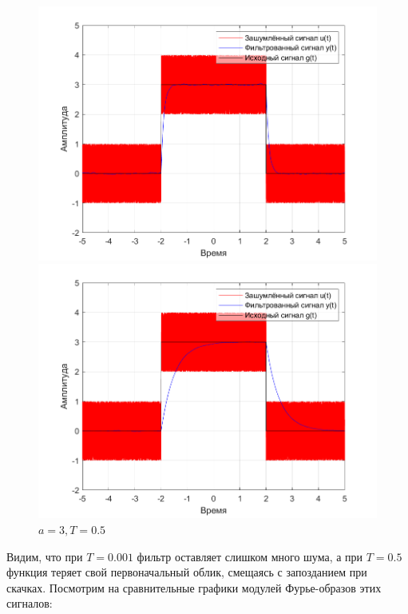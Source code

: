 \documentclass[a4paper]{article}
\begin{document}
\begin{figure}[H]
    \begin{minipage}{0.5\textwidth}
        \centering
        \includegraphics[width=\linewidth]{ex1_1/a=3_T=0.1/h1.png}
        \caption{$a = 3, T = 0.1$}
    \end{minipage}
    \begin{minipage}{0.5\textwidth}
        \centering
        \includegraphics[width=\linewidth]{ex1_1/a=3_T=0.5/h1.png}
        \caption{$a = 3, T = 0.5$}
    \end{minipage}
\end{figure}

Видим, что при $T = 0.001$ фильтр оставляет слишком много шума, а при $T = 0.5$ функция теряет свой первоначальный облик, смещаясь с запозданием при скачках. Посмотрим на сравнительные графики модулей Фурье-образов этих сигналов: 
\end{document}
